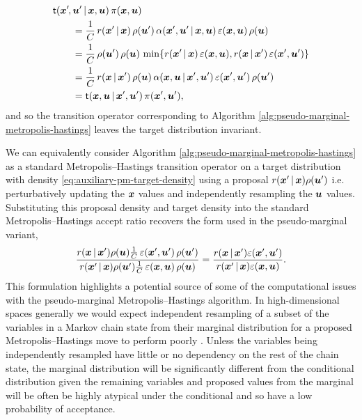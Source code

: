 \begin{equation}
\begin{split}
  &\trans(\vct{x}'\kern-1pt,\vct{u}'\gvn\vct{x},\vct{u}) \, \pi(\vct{x},\vct{u}) \\
  &\qquad=
  \frac{1}{C} \, r(\vct{x}'\gvn\vct{x}) \, \rho(\vct{u}')\, 
  \alpha(\vct{x}',\vct{u}'\gvn\vct{x},\vct{u}) \,
 \esttgtdens(\vct{x},\vct{u})\,\rho(\vct{u})\\
  &\qquad=
  \frac{1}{C} \,\rho(\vct{u}')\,\rho(\vct{u})\, 
  \min\lbr 
    r(\vct{x}'\gvn\vct{x})\,\esttgtdens(\vct{x},\vct{u}),
    r(\vct{x}\gvn\vct{x}')\,\esttgtdens(\vct{x}',\vct{u}')
  \rbr
  \\
  &\qquad=
  \frac{1}{C} \, r(\vct{x}\gvn\vct{x}') \, \rho(\vct{u})\, 
  \alpha(\vct{x},\vct{u}\gvn\vct{x}',\vct{u}') \,
 \esttgtdens(\vct{x}',\vct{u}')\,\rho(\vct{u}')\\
 &\qquad=
 \trans(\vct{x},\vct{u}\gvn\vct{x}',\vct{u}') \, \pi(\vct{x}',\vct{u}'),
\end{split}
\end{equation}
and so the transition operator corresponding to Algorithm \ref{alg:pseudo-marginal-metropolis-hastings} leaves the target distribution invariant. 

We can equivalently consider Algorithm \ref{alg:pseudo-marginal-metropolis-hastings} as a standard Metropolis--Hastings transition operator on a target distribution with density  \eqref{eq:auxiliary-pm-target-density} using a proposal $r(\boldsymbol{x}'\operatorname{|}\boldsymbol{x})\rho(\boldsymbol{u}')$ i.e. perturbatively updating the $\boldsymbol{x}$ values and independently resampling the $\boldsymbol{u}$ values. Substituting this proposal density and target density into the standard Metropolis--Hastings accept ratio recovers the form used in the pseudo-marginal variant,
\begin{equation}
\frac
  {r(\boldsymbol{x}\operatorname{|}\boldsymbol{x}')\rho(\boldsymbol{u})  \frac{1}{C} \,\varepsilon(\boldsymbol{x}',\boldsymbol{u}')\,\rho(\boldsymbol{u}')}
  {r(\boldsymbol{x}'\operatorname{|}\boldsymbol{x})\rho(\boldsymbol{u}')  \frac{1}{C} \,\varepsilon(\boldsymbol{x},\boldsymbol{u})\,\rho(\boldsymbol{u})}
  =
\frac
  {r(\boldsymbol{x}\operatorname{|}\boldsymbol{x}')\varepsilon(\boldsymbol{x}',\boldsymbol{u}')}
  {r(\boldsymbol{x}'\operatorname{|}\boldsymbol{x})\varepsilon(\boldsymbol{x},\boldsymbol{u})}.
\end{equation}
This formulation highlights a potential source of some of the computational issues with the pseudo-marginal Metropolis--Hastings algorithm. In high-dimensional spaces generally we would expect independent resampling of a subset of the variables in a Markov chain state from their marginal distribution for a proposed Metropolis--Hastings move to perform poorly \citep{neal2015optimal}. Unless the variables being independently resampled have little or no dependency on the rest of the chain state, the marginal distribution will be significantly different from the conditional distribution given the remaining variables and proposed values from the marginal will be often be highly atypical under the conditional and so have a low probability of acceptance.

